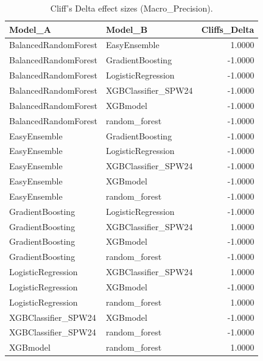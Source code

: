 \begin{table}[t]
\centering
\begin{tabular}{llr}
\toprule
Model_A & Model_B & Cliffs_Delta \\
\midrule
BalancedRandomForest & EasyEnsemble & 1.0000 \\
BalancedRandomForest & GradientBoosting & -1.0000 \\
BalancedRandomForest & LogisticRegression & -1.0000 \\
BalancedRandomForest & XGBClassifier_SPW24 & -1.0000 \\
BalancedRandomForest & XGBmodel & -1.0000 \\
BalancedRandomForest & random_forest & -1.0000 \\
EasyEnsemble & GradientBoosting & -1.0000 \\
EasyEnsemble & LogisticRegression & -1.0000 \\
EasyEnsemble & XGBClassifier_SPW24 & -1.0000 \\
EasyEnsemble & XGBmodel & -1.0000 \\
EasyEnsemble & random_forest & -1.0000 \\
GradientBoosting & LogisticRegression & -1.0000 \\
GradientBoosting & XGBClassifier_SPW24 & 1.0000 \\
GradientBoosting & XGBmodel & -1.0000 \\
GradientBoosting & random_forest & -1.0000 \\
LogisticRegression & XGBClassifier_SPW24 & 1.0000 \\
LogisticRegression & XGBmodel & -1.0000 \\
LogisticRegression & random_forest & 1.0000 \\
XGBClassifier_SPW24 & XGBmodel & -1.0000 \\
XGBClassifier_SPW24 & random_forest & -1.0000 \\
XGBmodel & random_forest & 1.0000 \\
\bottomrule
\end{tabular}
\caption{Cliff's Delta effect sizes (Macro_Precision).}
\label{tab:cliffs_Macro_Precision}
\end{table}